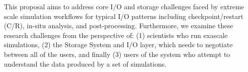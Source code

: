%
This proposal aims to address core I/O and storage challenges faced by 
extreme scale simulation workflows for typical I/O patterns including 
checkpoint/restart (C/R), in-situ analysis, and post-processing.
%
Furthermore, we examine these research challenges from the perspective of:
%
(1) scientists who run exascale simulations,
%
(2) the Storage System and I/O layer, which needs to negotiate between all of
the users, and finally
%
(3) users of the system who attempt to understand the data
produced by a set of simulations.

